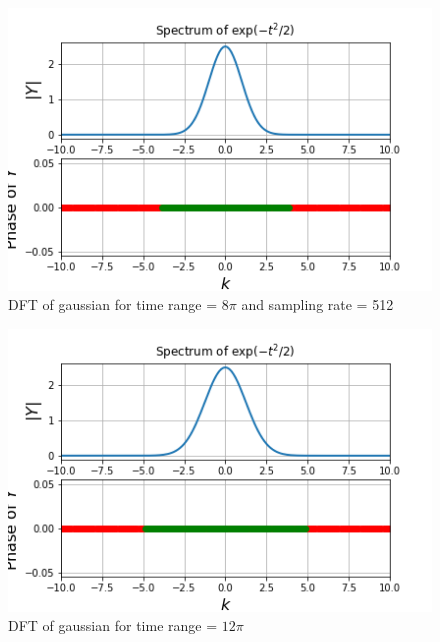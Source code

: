 \documentclass[11pt, a4paper]{article}
\begin{document}
\begin{figure}[!tbh]
   	\centering
   	\includegraphics[scale=0.8]{fig7.png}  %
   	\caption{DFT of gaussian for time range = $8\pi$ and sampling rate = 512}
   	\label{fig:sample}
   \end{figure} 


\begin{figure}[!tbh]
   	\centering
   	\includegraphics[scale=0.8]{fig8.png}  %
   	\caption{DFT of gaussian for time range = $12\pi$}
   	\label{fig:sample}
   \end{figure}
   
\end{document}
